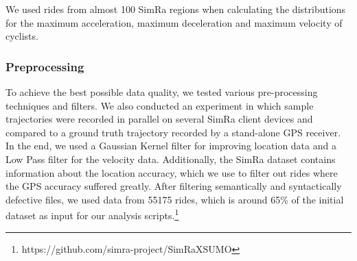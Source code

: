 We used rides from almost \num{100} SimRa regions when calculating the distributions for the maximum acceleration, maximum deceleration and maximum velocity of cyclists.

\subsubsection{Preprocessing}
\label{subsubsec:preprocessing_sumo}
To achieve the best possible data quality, we tested various pre-processing techniques and filters.
We also conducted an experiment in which sample trajectories were recorded in parallel on several SimRa client devices and compared to a ground truth trajectory recorded by a stand-alone GPS receiver.
In the end, we used a Gaussian Kernel filter for improving location data and a Low Pass filter for the velocity data.
Additionally, the SimRa dataset contains information about the location accuracy, which we use to filter out rides where the GPS accuracy suffered greatly.
After filtering semantically and syntactically defective files, we used data from \num{55175} rides, which is around \num{65}\% of the initial dataset as input for our analysis scripts.\footnote{https://github.com/simra-project/SimRaXSUMO}

